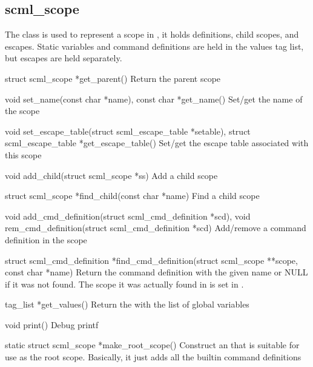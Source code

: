 \subsection{scml\_scope}

The  class is used to represent a scope in \SCML{}, it holds
definitions, child scopes, and escapes.  Static variables and command
definitions are held in the values tag list, but escapes are held separately.

\begin{cprototypelist}
  \item[struct scml_scope *get_parent()] Return the parent scope

  \item[void set_name(const char *name), const char *get_name()]
  Set/get the name of the scope

  \item[void set_escape_table(struct scml_escape_table *setable),
  struct scml_escape_table *get_escape_table()] Set/get the escape table
  associated with this scope

  \item[void add_child(struct scml_scope *ss)] Add a child scope

  \item[struct scml_scope *find_child(const char *name)] Find a
  child scope

  \item[void add_cmd_definition(struct scml_cmd_definition *scd),
		    void rem_cmd_definition(struct scml_cmd_definition *scd)]
  Add/remove a command definition in the scope

  \item[struct scml_cmd_definition *find_cmd_definition(struct
  scml_scope **scope, const char *name)] Return the command definition with
  the given name or NULL if it was not found.  The scope it was actually found
  in is set in .

  \item[tag_list *get_values()] Return the  with
  the list of global variables

  \item[void print()] Debug printf

  \item[static struct scml_scope *make_root_scope()] Construct an
   that is suitable for use as the root scope.  Basically, it
  just adds all the builtin command definitions
\end{cprototypelist}

